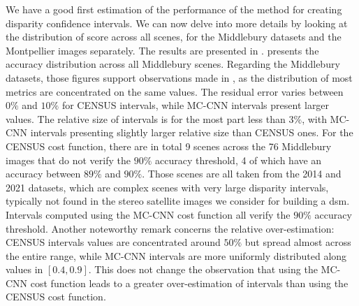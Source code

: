 We have a good first estimation of the performance of the method for creating disparity confidence intervals. We can now delve into more details by looking at the distribution of score across all scenes, for the Middlebury datasets and the Montpellier images separately. The results are presented in .  presents the accuracy distribution across all Middlebury scenes. Regarding the Middlebury datasets, those figures support observations made in , as the distribution of most metrics are concentrated on the same values. The residual error varies between $0\%$ and $10\%$ for CENSUS intervals, while MC-CNN intervals present larger values. The relative size of intervals is for the most part less than $3\%$, with MC-CNN intervals presenting slightly larger relative size than CENSUS ones. For the CENSUS cost function, there are in total 9 scenes across the 76 Middlebury images that do not verify the $90\%$ accuracy threshold, 4 of which have an accuracy between $89\%$ and $90\%$. Those scenes are all taken from the 2014 and 2021 datasets, which are complex scenes with very large disparity intervals, typically not found in the stereo satellite images we consider for building a \acrshort{dsm}. Intervals computed using the MC-CNN cost function all verify the $90\%$ accuracy threshold. Another noteworthy remark concerns the relative over-estimation: CENSUS intervals values are concentrated around $50\%$ but spread almost across the entire range, while MC-CNN intervals are more uniformly distributed along values in $[0.4, 0.9]$. This does not change the observation that using the MC-CNN cost function leads to a greater over-estimation of intervals than using the CENSUS cost function.

